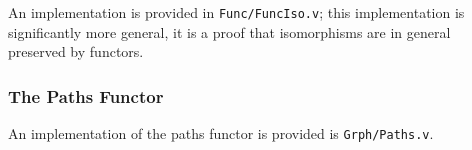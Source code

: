 \documentclass[12pt,twocolumn,oneside]{book}
\begin{document}
An implementation is provided in \texttt{Func/FuncIso.v}; this implementation is
significantly more general, it is a proof that isomorphisms are in general preserved
by functors.


\subsubsection{The Paths Functor}

An implementation of the paths functor is provided is \texttt{Grph/Paths.v}.
\end{document}
